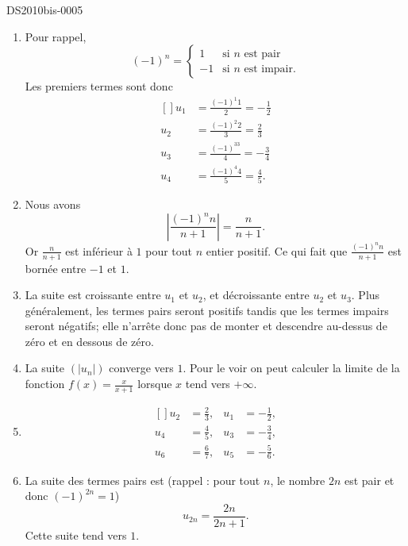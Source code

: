 
\begin{corrige}{DS2010bis-0005}


	\begin{enumerate}
		\item
			Pour rappel, 
			\begin{equation}
				(-1)^n=\begin{cases}
					1	&	\text{si $n$ est pair}\\
					-1	&	 \text{si $n$ est impair.}
				\end{cases}
			\end{equation}
			Les premiers termes sont donc
			\begin{equation}
				\begin{aligned}[]
					u_1&=\frac{(-1)^1 1 }{2}=-\frac{ 1 }{2}\\
					u_2&=\frac{(-1)^2 2 }{3}=\frac{ 2 }{ 3 }\\
					u_3&=\frac{(-1)^33}{ 4 }=-\frac{ 3 }{ 4 }\\
					u_4&=\frac{(-1)^4 4}{ 5 }=\frac{ 4 }{ 5 }.
				\end{aligned}
			\end{equation}
		\item
			Nous avons
			\begin{equation}
				\left| \frac{(-1)^nn}{ n+1 } \right|=\frac{n}{ n+1 }.
			\end{equation}
			Or $\frac{n}{ n+1 }$ est inférieur à $1$ pour tout $n$ entier positif. Ce qui fait que $\frac{(-1)^nn}{ n+1 }$ est bornée entre $-1$ et $1$. 
		\item
			La suite est croissante entre $u_1$ et $u_2$, et décroissante entre $u_2$ et $u_3$. Plus généralement, les termes pairs seront positifs tandis que les termes impairs seront négatifs; elle n'arrête donc pas de monter et descendre au-dessus de zéro et en dessous de zéro.
		\item
			La suite $(| u_n |)$ converge vers $1$. Pour le voir on peut calculer la limite de la fonction $f(x)=\frac{x}{ x+1 }$ lorsque $x$ tend vers $+\infty$.  
		\item
			\begin{equation}
				\begin{aligned}[]
					u_2&=\frac{ 2 }{3},	&u_1&=-\frac{1}{2},\\
					u_4&=\frac{ 4 }{5},	&u_3&=-\frac{ 3 }{ 4 },\\
					u_6&=\frac{ 6 }{7},	&u_5&=-\frac{ 5 }{ 6 }.
				\end{aligned}
			\end{equation}
		\item
			La suite des termes pairs est (rappel : pour tout $n$, le nombre $2n$ est pair et donc $(-1)^{2n}=1$)
			\begin{equation}
				u_{2n}=\frac{2n}{ 2n+1 }.
			\end{equation}
			Cette suite tend vers $1$.


\end{enumerate}
\end{corrige}
